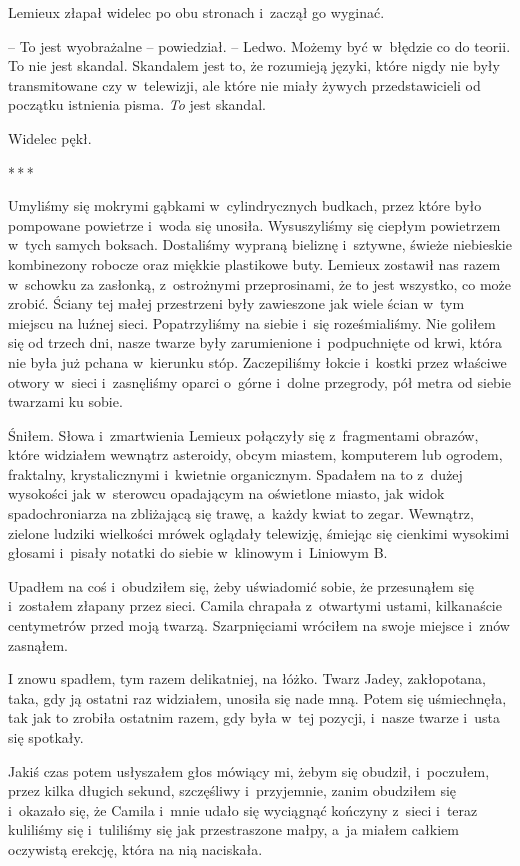 \documentclass[oneside,polish,12pt,sfheadings]{mwbk}
\newcommand{\threeast}{\bigskip\par\centerline{*\,*\,*}\medskip\par}%
\begin{document}
Lemieux złapał widelec po obu stronach i~zaczął go wyginać.

-- To jest wyobrażalne -- powiedział. -- Ledwo. Możemy być w~błędzie co do
teorii. To nie jest skandal. Skandalem jest to, że rozumieją języki,
które nigdy nie były transmitowane czy w~telewizji, ale które nie miały
żywych przedstawicieli od początku istnienia pisma. \emph{To} jest
skandal.

Widelec pękł.

\threeast

Umyliśmy się mokrymi gąbkami w~cylindrycznych budkach, przez które było
pompowane powietrze i~woda się unosiła. Wysuszyliśmy się ciepłym
powietrzem w~tych samych boksach. Dostaliśmy wypraną bieliznę i~sztywne,
świeże niebieskie kombinezony robocze oraz miękkie plastikowe buty.
Lemieux zostawił nas razem w~schowku za zasłonką, z~ostrożnymi
przeprosinami, że to jest wszystko, co może zrobić. Ściany tej małej
przestrzeni były zawieszone jak wiele ścian w~tym miejscu na luźnej
sieci. Popatrzyliśmy na siebie i~się roześmialiśmy. Nie goliłem się od
trzech dni, nasze twarze były zarumienione i~podpuchnięte od krwi, która
nie była już pchana w~kierunku stóp. Zaczepiliśmy łokcie i~kostki przez
właściwe otwory w~sieci i~zasnęliśmy oparci o~górne i~dolne przegrody,
pół metra od siebie twarzami ku sobie.

Śniłem. Słowa i~zmartwienia Lemieux połączyły się z~fragmentami obrazów,
które widziałem wewnątrz asteroidy, obcym miastem, komputerem lub
ogrodem, fraktalny, krystalicznymi i~kwietnie organicznym. Spadałem na
to z~dużej wysokości jak w~sterowcu opadającym na oświetlone miasto, jak
widok spadochroniarza na zbliżającą się trawę, a~każdy kwiat to zegar.
Wewnątrz, zielone ludziki wielkości mrówek oglądały telewizję, śmiejąc
się cienkimi wysokimi głosami i~pisały notatki do siebie w~klinowym i~Liniowym B.

Upadłem na coś i~obudziłem się, żeby uświadomić sobie, że przesunąłem
się i~zostałem złapany przez sieci. Camila chrapała z~otwartymi ustami,
kilkanaście centymetrów przed moją twarzą. Szarpnięciami wróciłem na
swoje miejsce i~znów zasnąłem.

I znowu spadłem, tym razem delikatniej, na łóżko. Twarz Jadey,
zakłopotana, taka, gdy ją ostatni raz widziałem, unosiła się nade mną.
Potem się uśmiechnęła, tak jak to zrobiła ostatnim razem, gdy była w~tej
pozycji, i~nasze twarze i~usta się spotkały.

Jakiś czas potem usłyszałem głos mówiący mi, żebym się obudził, i~poczułem, przez kilka długich sekund, szczęśliwy i~przyjemnie, zanim
obudziłem się i~okazało się, że Camila i~mnie udało się wyciągnąć
kończyny z~sieci i~teraz kuliliśmy się i~tuliliśmy się jak przestraszone
małpy, a~ja miałem całkiem oczywistą erekcję, która na nią naciskała.
\end{document}
